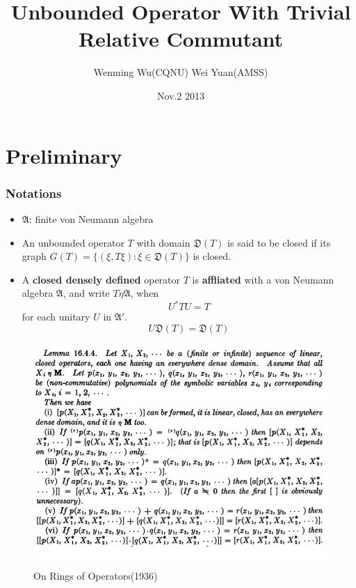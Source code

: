 \documentclass[serif,mathserif]{beamer}
\author[W. Yuan \& W. Wu]{Wenming Wu(CQNU) \quad Wei Yuan(AMSS)}
\title[\hspace{2em}\insertframenumber/\inserttotalframenumber]
{Unbounded Operator With Trivial Relative Commutant}
\date[]{Nov.2 2013} %
\institute{Dartmouth College}
\newcommand{\AAA}{\mathfrak A}
\newcommand{\DDD}{\mathfrak D}
\begin{document}
\maketitle

\section{Preliminary}  %

\begin{frame}
\frametitle{Notations}
\begin{itemize}
  \item $\AAA$: finite von Neumann algebra \pause
  \item An unbounded operator $T$ with domain $\DDD(T)$ is said to be
        closed if its graph $G(T) = \{(\xi, T\xi): \xi \in \DDD(T)\}$ is
        closed. \pause
  \item A \textbf{closed densely defined} operator $T$ is \textbf{affliated} with
    a von Neumann algebra $\AAA$, and write $T \eta \AAA$, when
    $$U^{*}TU = T$$ 
    for each unitary $U$ in $\AAA'$. \pause
    $$U \DDD(T) = \DDD(T)$$
\end{itemize}
\end{frame}


\begin{frame}
    \begin{figure}[t]
    \centering
      \includegraphics[scale=0.3]{vm.png}
      \caption{\small{On Rings of Operators(1936)}}
  \end{figure}
\end{frame}
\end{document}
